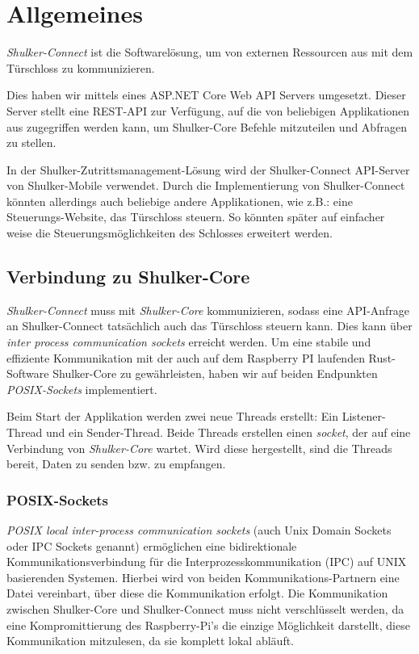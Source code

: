 \lstset{language=[Sharp]C}
\chapter{Allgemeines}
\textit{Shulker-Connect} ist die Softwarelösung, um von externen Ressourcen aus mit dem Türschloss zu kommunizieren.

Dies haben wir mittels eines ASP.NET Core Web API Servers umgesetzt. Dieser Server stellt eine REST-API zur Verfügung, 
auf die von beliebigen Applikationen aus zugegriffen werden kann, um Shulker-Core Befehle mitzuteilen und Abfragen zu stellen.

In der Shulker-Zutrittsmanagement-Lösung wird der Shulker-Connect API-Server von Shulker-Mobile verwendet. 
Durch die Implementierung von Shulker-Connect könnten allerdings auch beliebige andere Applikationen, 
wie z.B.: eine Steuerungs-Website, das Türschloss steuern. 
So könnten später auf einfacher weise die Steuerungsmöglichkeiten des Schlosses erweitert werden.

\section{Verbindung zu Shulker-Core}
\textit{Shulker-Connect} muss mit \textit{Shulker-Core} kommunizieren, sodass eine API-Anfrage an Shulker-Connect tatsächlich
auch das Türschloss steuern kann.
Dies kann über \textit{inter process communication sockets} erreicht werden. 
Um eine stabile und effiziente Kommunikation mit der auch auf dem Raspberry PI laufenden Rust-Software Shulker-Core zu 
gewährleisten, haben wir auf beiden Endpunkten \textit{POSIX-Sockets} implementiert.

Beim Start der Applikation werden zwei neue Threads erstellt: Ein Listener-Thread und ein Sender-Thread.
Beide Threads erstellen einen \textit{socket}, der auf eine Verbindung von \textit{Shulker-Core} wartet.
Wird diese hergestellt, sind die Threads bereit, Daten zu senden bzw. zu empfangen. 

\subsection{POSIX-Sockets}
\textit{POSIX local inter-process communication sockets} (auch Unix Domain Sockets oder IPC Sockets genannt) ermöglichen
eine bidirektionale Kommunikationsverbindung für die Interprozesskommunikation (IPC) auf UNIX basierenden Systemen.
Hierbei wird von beiden Kommunikations-Partnern eine Datei vereinbart, über diese die Kommunikation erfolgt. \cite{ipcsockets}
Die Kommunikation zwischen Shulker-Core und Shulker-Connect muss nicht verschlüsselt werden, da eine Kompromittierung des
Raspberry-Pi's die einzige Möglichkeit darstellt, diese Kommunikation mitzulesen, da sie komplett lokal abläuft. 

